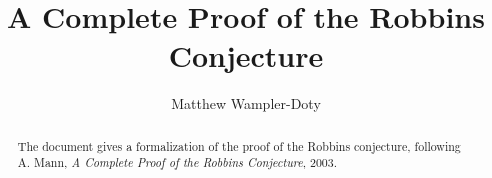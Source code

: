 \documentclass[11pt,a4paper]{article}
\begin{document}
\title{A Complete Proof of the Robbins Conjecture}
\author{Matthew Wampler-Doty}
\maketitle

\begin{abstract}
The document gives a formalization of the proof of the Robbins 
conjecture, following A. Mann, \emph{A Complete Proof of the 
Robbins Conjecture}, 2003.
\end{abstract}

\tableofcontents


\end{document}
